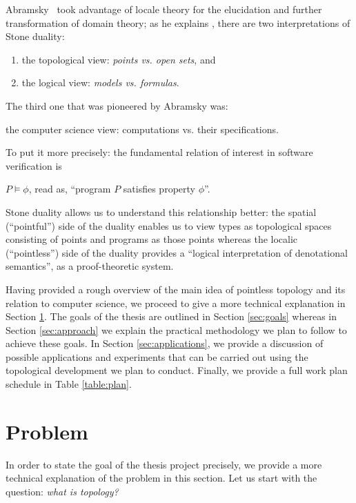 \documentclass{article}
\begin{document}
Abramsky~\cite{abramsky:1991} took advantage of locale theory for the elucidation and
further transformation of domain theory; as he explains \cite{abramsky:1991}, there are
two interpretations of Stone duality:
\begin{enumerate}
  \item the topological view: \emph{points vs. open sets}, and
  \item the logical view: \emph{models vs. formulas}.
\end{enumerate}
The third one that was pioneered by Abramsky was:
\begin{center}
  the computer science view: computations vs. their specifications.
\end{center}

To put it more precisely: the fundamental relation of interest in software verification is

\begin{center}
  $P \vDash \phi$, \qquad read as, \qquad ``program $P$ satisfies property $\phi$''.
\end{center}

Stone duality allows us to understand this relationship better: the spatial (``pointful'')
side of the duality enables us to view types as topological spaces consisting of points
and programs as those points whereas the localic (``pointless'') side of the duality
provides a ``logical interpretation of denotational semantics'', as a proof-theoretic
system.

Having provided a rough overview of the main idea of pointless topology and its relation
to computer science, we proceed to give a more technical explanation in Section
\ref{sec:problem}. The goals of the thesis are outlined in Section \ref{sec:goals} whereas
in Section \ref{sec:approach} we explain the practical methodology we plan to follow to
achieve these goals. In Section \ref{sec:applications}, we provide a discussion of
possible applications and experiments that can be carried out using the topological
development we plan to conduct. Finally, we provide a full work plan schedule in Table
\ref{table:plan}.

\section{Problem}\label{sec:problem}

In order to state the goal of the thesis project precisely, we provide a more technical
explanation of the problem in this section. Let us start with the question:
\emph{what is topology?}
\end{document}
